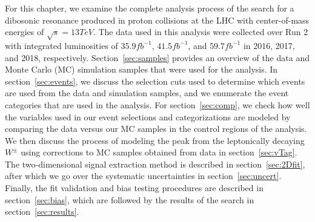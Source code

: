 For this chapter, we examine the complete analysis process of the search for a dibosonic resonance produced in proton collisions at the LHC with center-of-mass energies of $\sqrt{s}=13\unit{TeV}$.
The data used in this analysis were collected over Run 2 with integrated luminosities of $35.9\unit{fb^{-1}}$, $41.5\unit{fb^{-1}}$, and $59.7\unit{fb^{-1}}$ in 2016, 2017, and 2018, respectively.
Section~\ref{sec:samples} provides an overview of the data and Monte Carlo (MC) simulation samples that were used for the analysis.
In section~\ref{sec:events}, we discuss the selection cuts used to determine which events are used from the data and simulation samples, and we enumerate the event categories that are used in the analysis.
For section~\ref{sec:comp}, we check how well the variables used in our event selections and categorizations are modeled by comparing the data versus our MC samples in the control regions of the analysis.
We then discuss the process of modeling the peak from the leptonically decaying $W^\pm$ using corrections to MC samples obtained from data in section~\ref{sec:vTag}.
The two-dimensional signal extraction method is described in section~\ref{sec:2Dfit}, after which we go over the systematic uncertainties in section~\ref{sec:uncert}.
Finally, the fit validation and bias testing procedures are described in section~\ref{sec:bias}, which are followed by the results of the search in section~\ref{sec:results}.
